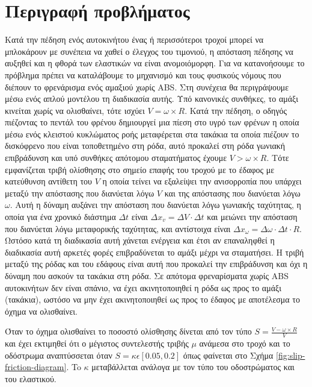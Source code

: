 \documentclass{article}
\begin{document}
\section{Περιγραφή προβλήματος}
Κατά την πέδηση ενός αυτοκινήτου ένας ή περισσότεροι τροχοί μπορεί να μπλοκάρουν με συνέπεια να χαθεί ο έλεγχος του τιμονιού, η απόσταση πέδησης να αυξηθεί και η φθορά των ελαστικών να είναι ανομοιόμορφη. Για να κατανοήσουμε το πρόβλημα πρέπει να καταλάβουμε το μηχανισμό και τους φυσικούς νόμους που διέπουν το φρενάρισμα ενός αμαξιού χωρίς ABS. Στη συνέχεια θα περιγράψουμε μέσω ενός απλού μοντέλου τη διαδικασία αυτής. Υπό κανονικές συνθήκες, το αμάξι κινείται χωρίς να ολισθαίνει, τότε ισχύει $V=\omega\times R$. Κατά την πέδηση, ο οδηγός πιέζοντας το πεντάλ του φρένου δημιουργεί μια πίεση στο υγρό των φρένων η οποία μέσω ενός κλειστού κυκλώματος ροής μεταφέρεται στα τακάκια τα οποία πιέζουν το δισκόφρενο που είναι τοποθετημένο στη ρόδα, αυτό προκαλεί στη ρόδα γωνιακή επιβράδυνση και υπό συνθήκες απότομου σταματήματος έχουμε $V >\omega\times R$. Τότε εμφανίζεται τριβή ολίσθησης στο σημείο επαφής του τροχού με το έδαφος με κατεύθυνση αντίθετη του $V$ η οποία τείνει να εξαλείψει την ανισορροπία που υπάρχει μεταξύ την απόστασης που διανύεται λόγω $V$ και της απόστασης που διανύεται λόγω $\omega$. Αυτή η δύναμη αυξάνει την απόσταση που διανύεται λόγω γωνιακής ταχύτητας, η οποία για ένα χρονικό διάστημα $\Delta t$ είναι $\Delta x_v = \Delta V \cdot \Delta t$ και μειώνει την απόσταση που διανύεται λόγω μεταφορικής ταχύτητας, και αντίστοιχα είναι $\Delta x_\omega = \Delta \omega \cdot \Delta t \cdot R$. Ωστόσο κατά τη διαδικασία αυτή χάνεται ενέργεια και έτσι αν επαναληφθεί η διαδικασία αυτή αρκετές φορές επιβραδύνεται το αμάξι μέχρι να σταματήσει. Η τριβή μεταξύ της ρόδας και του εδάφους είναι αυτή που προκαλεί την επιβράδυνση και όχι η δύναμη που ασκούν τα τακάκια στη ρόδα. Σε απότομα φρεναρίσματα χωρίς ABS αυτοκινήτων δεν είναι σπάνιο, να έχει ακινητοποιηθεί η ρόδα ως προς το αμάξι (τακάκια), ωστόσο να μην έχει ακινητοποιηθεί ως προς το έδαφος με αποτέλεσμα το όχημα να ολισθαίνει. 

Όταν το όχημα ολισθαίνει το ποσοστό ολίσθησης δίνεται από τον τύπο $S=\frac{V-\omega\times R}{V}$ και έχει εκτιμηθεί ότι ο μέγιστος συντελεστής τριβής $\mu$ ανάμεσα στο τροχό και το οδόστρωμα αναπτύσσεται όταν $S=\kappa\epsilon[0.05,0.2]$ όπως φαίνεται στο Σχήμα \ref{fig:slip-friction-diagram}. To $\kappa$ μεταβάλλεται ανάλογα με τον τύπο του οδοστρώματος και του ελαστικού.
\end{document}
